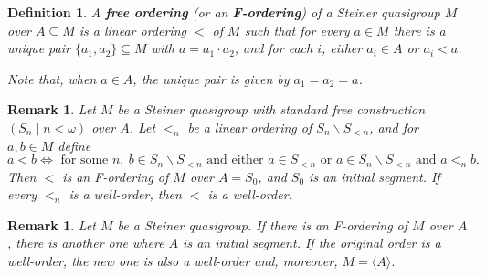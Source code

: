 \documentclass[10pt,a4paper]{article}
\theoremstyle{note}
\newtheorem{df}[thm]{Definition}
\newtheorem{rmk}[thm]{Remark}
\begin{document}
	\begin{df}
		A \textbf{free ordering}  (or an \textbf{F-ordering})   of a Steiner quasigroup $M$ over $A\subseteq M$ is a linear ordering $<$ of $M$ such that for every $a\in M$  there is a unique pair $\{a_1,a_2\}\subseteq M$ with $a=a_1\cdot a_2$,  and for each $i$, either $a_i\in A$ or $a_i<a$. 
		
		Note that, when $a\in A$, the unique pair is given by $a_1=a_2=a$.
	\end{df}
	
	\begin{rmk}\label{May12_12.0} Let $M$ be a Steiner quasigroup with standard free construction $(S_n\mid n<\omega)$ over $A$. Let $<_n$ be a linear ordering of $S_n\smallsetminus S_{<n}$, and for $a,b\in M$ define
	$$a<b \Leftrightarrow \mbox{ for some } n, \ b\in S_n\smallsetminus S_{<n} \mbox{ and either } a\in S_{<n} \mbox{ or } a\in S_n\smallsetminus S_{<n} \mbox{ and } a<_n b.  $$ 
		Then $<$ is an F-ordering of $M$ over $A=S_0$, and $S_0$ is an initial segment. If every $<_n$ is a well-order, then $<$ is a well-order.
		\end{rmk}
		
	\begin{rmk}\label{May12_12.1}
		 Let $M$ be a Steiner quasigroup. If there is an F-ordering of $M$ over $A$, there is another one where $A$ is an initial segment. If the original order is a well-order, the new one is also a well-order and, moreover, $M=\langle A\rangle$.
	\end{rmk}	
	
\end{document}
